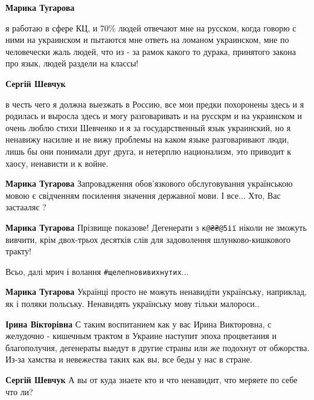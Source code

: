 \begin{itemize}
\begin{itemize}
\textbf{Марика Тугарова} 

я работаю в сфере КЦ, и 70\% людей отвечают мне на русском, когда говорю с ними
на украинском и пытаются мне ответь на ломаном украинском, мне по человечески
жаль людей, что из - за рамок какого то дурака, принятого закона про язык,
людей раздели на классы!


\textbf{Сергій Шевчук} 

в честь чего я должна выезжать в Россию, все мои предки похоронены здесь и я
родилась и выросла здесь и могу разговаривать и на русскрм и на украинском и
очень люблю стихи Шевченко и я за государственный язык украинский, но я
ненавижу насилие и не вижу проблемы на каком языке разговаривают люди, лишь бы
они понимали друг друга, и нетерплю национализм, это приводит к хаосу,
ненависти и к войне.



\textbf{Марика Тугарова} Запровадження обов’язкового обслуговування українською
мовою є свідченням посилення значення державної мови. І все... Хто, Вас
застааляє ?

\textbf{Марика Тугарова}
Прізвище показове! Дегенерати з \verb|к@₴₴@5ії| ніколи не зможуть вивчити, крім
двох-трьох десятків слів для задоволення шлунково-кишкового тракту!

Всьо, далі мрич і волання \verb|#щелепновивихнутих|...

\textbf{Марика Тугарова} Українці просто не можуть ненавидіти українську,
наприклад, як і поляки польську.  Ненавидять українську мову тільки малороси..



\textbf{Ірина Вікторівна} С таким воспитанием как у вас Ирина Викторовна, с
желудочно - кишечным трактом в Украине наступит эпоха процветания и
благополучия, дегенераты выедут в другие страны или же подохнут от обжорства.
Из-за хамства и невежества таких как вы, все беды у нас в стране.

\textbf{Сергій Шевчук} А вы от куда знаете кто и что ненавидит, что меряете по себе что ли?


\end{itemize}
\end{itemize}
